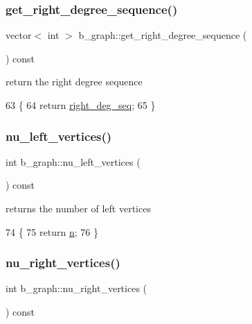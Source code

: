 \subsubsection{\texorpdfstring{get\+\_\+right\+\_\+degree\+\_\+sequence()}{get\_right\_degree\_sequence()}}
{\footnotesize\ttfamily vector$<$ int $>$ b\+\_\+graph\+::get\+\_\+right\+\_\+degree\+\_\+sequence (\begin{DoxyParamCaption}{ }\end{DoxyParamCaption}) const}



return the right degree sequence 


\begin{DoxyCode}
63 \{
64   \textcolor{keywordflow}{return} \hyperlink{classb__graph_ae4c875ed6a583a78f38dfe958f20fad5}{right\_deg\_seq};
65 \}
\end{DoxyCode}
\mbox{\label{classb__graph_a5e71d5c97f2501b0b93c17146cf7e68e}} 
\subsubsection{\texorpdfstring{nu\+\_\+left\+\_\+vertices()}{nu\_left\_vertices()}}
{\footnotesize\ttfamily int b\+\_\+graph\+::nu\+\_\+left\+\_\+vertices (\begin{DoxyParamCaption}{ }\end{DoxyParamCaption}) const}



returns the number of left vertices 


\begin{DoxyCode}
74 \{
75   \textcolor{keywordflow}{return} \hyperlink{classb__graph_a9e211d40c1799bc9b125de472ff06642}{n};
76 \}
\end{DoxyCode}
\mbox{\label{classb__graph_abecfd7d6fbd0d9a554fe0d9aa3241a04}} 
\subsubsection{\texorpdfstring{nu\+\_\+right\+\_\+vertices()}{nu\_right\_vertices()}}
{\footnotesize\ttfamily int b\+\_\+graph\+::nu\+\_\+right\+\_\+vertices (\begin{DoxyParamCaption}{ }\end{DoxyParamCaption}) const}



